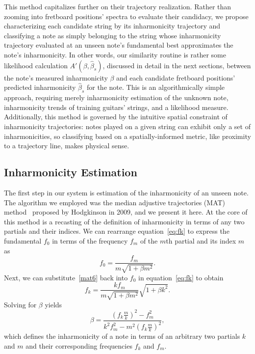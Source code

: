 \documentclass[12pt]{cmuthesis}
\begin{document}
This method capitalizes further on their trajectory realization. Rather than zooming into fretboard positions' spectra to evaluate their candidacy, we propose characterizing each candidate string by its inharmonicity trajectory and classifying a note as simply belonging to the string whose inharmonicity trajectory evaluated at an unseen note's fundamental best approximates the note's inharmonicity. In other words, our similarity routine is rather some likelihood calculation $A'(\beta,\hat{\beta}_s)$, discussed in detail in the next sections, between the note's measured inharmonicity $\beta$ and each candidate fretboard positions' predicted inharmonicity $\hat{\beta}_s$ for the note. This is an algorithmically simple approach, requiring merely inharmonicity estimation of the unknown note, inharmonicity trends of training guitars' strings, and a likelihood measure. Additionally, this method is governed by the intuitive spatial constraint of inharmonicity trajectories: notes played on a given string can exhibit only a set of inharmonicities, so classifying based on a spatially-informed metric, like proximity to a trajectory line, makes physical sense.

\subsection{Inharmonicity Estimation}
\label{mat}
The first step in our system is estimation of the inharmonicity of an unseen note. The algorithm we employed was the median adjustive trajectories (MAT) method~\cite{hodgkinson2009} proposed by Hodgkinson in 2009, and we present it here. At the core of this method is a recasting of the definition of inharmonicity in terms of any two partials and their indices. We can rearrange equation~\eqref{eq:fk} to express the fundamental $f_0$ in terms of the frequency $f_m$ of the $m$th partial and its index $m$ as
\begin{equation}
\label{mat6}
f_0 = \frac{f_m}{m\sqrt{1+\beta m^2}}.
\end{equation}
Next, we can substitute~\eqref{mat6} back into $f_0$ in equation~\eqref{eq:fk} to obtain
\begin{equation}
\label{mat7}
f_k = \frac{kf_m}{m\sqrt{1+\beta m^2}}\sqrt{1+\beta k^2}.
\end{equation}
Solving for $\beta$ yields
\begin{equation}
\label{mat8}
\beta = \frac{(f_k\frac{m}{k})^2-f_m^2}{k^2f_m^2-m^2(f_k\frac{m}{k})^2},
\end{equation}
which defines the inharmonicity of a note in terms of an arbitrary two partials $k$ and $m$ and their corresponding frequencies $f_k$ and $f_m$.
\end{document}
